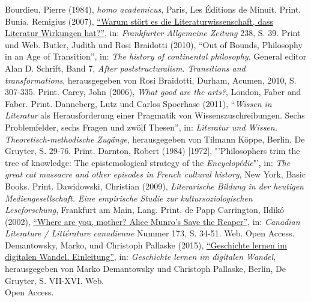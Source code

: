 \documentclass[fontsize=12pt]{scrartcl}
\begin{document}
{{{{\begin{thebibliography}
	Bourdieu, Pierre (1984), \textit{homo academicus}, Paris, Les \'{E}ditions de Minuit. Print.
	Bunia, Remigius (2007), \href{http://litwiss.bunia.de/folders/litwiss/bunia_esra.pdf}{"`Warum st\"ort es die Li\-te\-ra\-tur\-wissenschaft, dass Li\-te\-ra\-tur Wirkungen hat?"'}, in: \textit{Frankfurter Allgemeine Zeitung} 238, S. 39. Print und Web.
	Butler, Judith und Rosi Braidotti (2010), "`Out of Bounds, Philosophy in an Age of Transition"', in: \textit{The history of continental philosophy}, General editor Alan D. Schrift, Band 7, \textit{After poststructuralism. Transitions and transformations}, he\-rausgegeben von Rosi Braidotti, Durham, Acumen, 2010, S. 307-335. Print.
	Carey, John (2006), \textit{What good are the arts?}, London, Faber and Faber. Print.
	Danneberg, Lutz und Carlos Spoerhase (2011), "`\textit{Wissen in Li\-te\-ra\-tur} als He\-raus\-for\-de\-rung einer Pragmatik von Wissenszuschreibungen. Sechs Pro\-blem\-felder, sechs Fragen und zw\"olf Thesen"', in: \textit{Li\-te\-ra\-tur und Wissen. Theo\-retisch-methodische Zug\"ange}, he\-rausgegeben von Tilmann K\"oppe, Berlin, De Gruyter, S. 29-76. Print.
	Darnton, Robert (1984) [1972], "'Philosophers trim the tree of know\-ledge: The epistemological strategy of the \textit{Encyclop\'{e}die}"', in: \textit{The great cat massacre and other episodes in French cultural history}, New York, Basic Books. Print.
	Dawidowski, Christian (2009), \textit{Literarische Bildung in der heutigen Medienge\-sell\-schaft. Eine empirische Studie zur kultursoziologischen Lesefor\-schung}, Frankfurt am Main, Lang. Print.
	de Papp Carrington, Ildik\'{o} (2002), \href{http://canlit.ca/site/getPDF/article/10625}{"`Where are you, mother? Alice Munro's Save the Reaper"'}, in: \textit{Canadian Li\-te\-ra\-ture / Litt\'{e}rature canadienne} Nummer 173, S. 34-51. Web. Open Access.
	Demantowsky, Marko, und Christoph Pallaske (2015), \href{http://www.degruyter.com/view/books/9783486858662/9783486858662-001/9783486858662-001.xml}{"`Geschichte lernen im digitalen Wandel. Einleitung"'}, in: \textit{Geschichte lernen im digitalen Wandel}, he\-rausgegeben von Marko Demantowsky und Christoph Pallaske, Berlin, De Gruyter, S. VII-XVI. Web.\\ Open Access.

\end{thebibliography}}}}}
\end{document}
